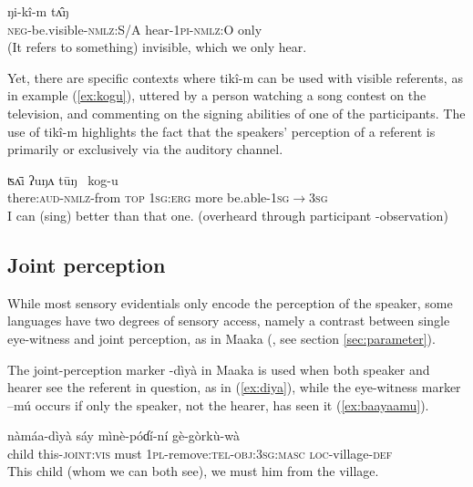 \documentclass[oneside,a4paper,11pt]{article}
\newcommand{\ipa}[1]{{\phon \mbox{#1}}} %
\begin{document}
\begin{exe}
\ex \label{ex:def}
\gll  	 	 \ipa{mu-toɔç-pɛ,} \ipa{ŋi-kî-m} \ipa{tʌ̂ŋ}   \\
\textsc{neg}-be.visible-\textsc{nmlz:S/A} hear-\textsc{1pi-nmlz:O} only  \\
\glt (It refers to something) invisible, which we only hear.
\end{exe}

Yet, there are specific contexts where \ipa{tikî-m}  can be used with visible referents, as in example  (\ref{ex:kogu}), uttered by a person watching a song contest on the television, and commenting on the signing abilities of one of the participants. The use of \ipa{tikî-m} highlights the  fact that the  speakers' perception of a referent is primarily or exclusively via the auditory channel.

\begin{exe}
\ex \label{ex:kogu}
\gll  	\ipa{tikî-m-kʌ}   	\ipa{ʦʌ̄i} \ipa{ʔuŋʌ} \ipa{tūŋ }   	\ipa{kog-u}   \\
there:\textsc{aud}-\textsc{nmlz}-from \textsc{top} \textsc{1sg:erg} more be.able-\textsc{1sg$\rightarrow$3sg}	  \\
\glt I can (sing) better than that one. (overheard through participant -observation)
\end{exe}

  

\subsection{Joint perception} \label{sec:joint}
While most sensory evidentials only encode the perception of the speaker, some languages have two degrees of sensory access, namely a contrast between single eye-witness and joint perception, as in Maaka (\citealt[195-7]{storch14maaka}, see section \ref{sec:parameter}).

 The joint-perception marker \ipa{-dìyà} in Maaka is used when both speaker and hearer see the referent in question, as in (\ref{ex:diya}), while the eye-witness marker \ipa{--mú} occurs if only the speaker, not the hearer, has seen it (\ref{ex:baayaamu}).
 
 \begin{exe}
\ex \label{ex:diya}
\gll \ipa{làa} 	\ipa{nàmáa-dìyà} 	\ipa{sáy} 	\ipa{mìnè-póɗí-ní} 	\ipa{gè-gòrkù-wà}  \\
child this-\textsc{joint:vis} must \textsc{1pl}-remove:\textsc{tel-obj:3sg:masc} \textsc{loc}-village-\textsc{def} \\
\glt This child (whom we can both see), we must him from the village.
\end{exe}
\end{document}
